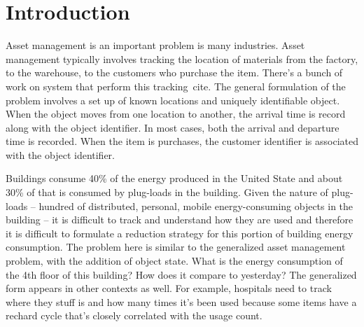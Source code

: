 \section{Introduction}
Asset management is an important problem is many industries.  Asset management typically involves tracking 
the location of materials from the factory, to the warehouse, to the customers who purchase the item.
There's a bunch of work on system that perform this tracking~cite{}.  The general formulation of the problem
involves a set up of known locations and uniquely identifiable object.  When the object moves from one location
to another, the arrival time is record along with the object identifier.  In most cases, both the arrival and
departure time is recorded.  When the item is purchases, the customer identifier is associated with the object
identifier.

Buildings consume 40\% of the energy produced in the United State and about 30\% of that is consumed by plug-loads
in the building.  Given the nature of plug-loads -- hundred of distributed, personal, mobile energy-consuming
objects in the building -- it is difficult to track and understand how they are used and therefore it is difficult
to formulate a reduction strategy for this portion of building energy consumption.  The problem here is similar
to the generalized asset management problem, with the addition of object state.  What is the energy consumption
of the 4th floor of this building?  How does it compare to yesterday?  The generalized form appears in other contexts
as well.  For example, hospitals need to track where they stuff is and how many times it's been used because some
items have a rechard cycle that's closely correlated with the usage count.
